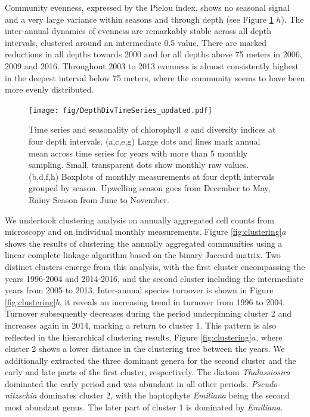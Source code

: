 \documentclass[draft]{agujournal2019}
\begin{document}
Community evenness, expressed by the Pielou index, shows no seasonal signal and a very large variance within seasons and through depth (see Figure \ref{fig:divts} $h$). The inter-annual dynamics of evenness are remarkably stable across all depth intervals, clustered around an intermediate 0.5 value. There are marked reductions in all depths towards 2000 and for all depths above 75 meters in 2006, 2009 and 2016. Throughout 2003 to 2013 evenness is almost consistently highest in the deepest interval below 75 meters, where the community seems to have been more evenly distributed. 


\begin{figure}
\begin{center}
\noindent\texttt{[image: fig/DepthDivTimeSeries\_updated.pdf]}
\end{center}
\caption{Time series and seasonality of chlorophyll \textit{a} and diversity indices at four depth intervals. (a,c,e,g) Large dots and lines mark annual mean across time series for years with more than 5 monthly sampling. Small, transparent dots show monthly raw values. (b,d,f,h) Boxplots of monthly measurements at four depth intervals grouped by season. Upwelling season goes from December to May, Rainy Season from June to November.}
\label{fig:divts}
\end{figure}


We undertook clustering analysis on annually aggregated cell counts from microscopy and on individual monthly measurements. Figure \ref{fig:clustering}$a$ shows the results of clustering the annually aggregated communities using a linear complete linkage algorithm based on the binary Jaccard matrix. Two distinct clusters emerge from this analysis, with the first cluster encompassing the years 1996-2004 and 2014-2016, and the second cluster including the intermediate years from 2005 to 2013. 
Inter-annual species turnover is shown in Figure \ref{fig:clustering}$b$, it reveals an increasing trend in turnover from 1996 to 2004. Turnover subsequently decreases during the period underpinning cluster 2 and increases again in 2014, marking a return to cluster 1. This pattern is also reflected in the hierarchical clustering results, Figure \ref{fig:clustering}$a$, where cluster 2 shows a lower distance in the clustering tree between the years. We additionally extracted the three dominant genera for the second cluster and the early and late parts of the first cluster, respectively. The diatom \textit{Thalassiosira} dominated the early period and was abundant in all other periods. \textit{Pseudo-nitzschia} dominates cluster 2, with the haptophyte \textit{Emiliana} being the second most abundant genus. The later part of cluster 1 is dominated by \textit{Emiliana}. 
\end{document}

